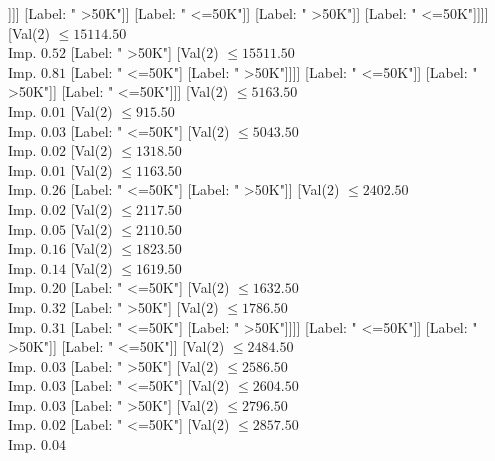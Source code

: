 \documentclass[margin=10pt]{standalone}
\begin{document}
\begin{forest}
																						[Label: " <=50K"]]]]
																			[Label: " >50K"]]
																		[Label: " <=50K"]]
																	[Label: " >50K"]]
																[Label: " <=50K"]]]]
													[Val($2$) $ \leq 15114.50$ \\ Imp. $0.52$
														[Label: " >50K"]
														[Val($2$) $ \leq 15511.50$ \\ Imp. $0.81$
															[Label: " <=50K"]
															[Label: " >50K"]]]]
												[Label: " <=50K"]]
											[Label: " >50K"]]
										[Label: " <=50K"]]]
								[Val($2$) $ \leq 5163.50$ \\ Imp. $0.01$
									[Val($2$) $ \leq 915.50$ \\ Imp. $0.03$
										[Label: " <=50K"]
										[Val($2$) $ \leq 5043.50$ \\ Imp. $0.02$
											[Val($2$) $ \leq 1318.50$ \\ Imp. $0.01$
												[Val($2$) $ \leq 1163.50$ \\ Imp. $0.26$
													[Label: " <=50K"]
													[Label: " >50K"]]
												[Val($2$) $ \leq 2402.50$ \\ Imp. $0.02$
													[Val($2$) $ \leq 2117.50$ \\ Imp. $0.05$
														[Val($2$) $ \leq 2110.50$ \\ Imp. $0.16$
															[Val($2$) $ \leq 1823.50$ \\ Imp. $0.14$
																[Val($2$) $ \leq 1619.50$ \\ Imp. $0.20$
																	[Label: " <=50K"]
																	[Val($2$) $ \leq 1632.50$ \\ Imp. $0.32$
																		[Label: " >50K"]
																		[Val($2$) $ \leq 1786.50$ \\ Imp. $0.31$
																			[Label: " <=50K"]
																			[Label: " >50K"]]]]
																[Label: " <=50K"]]
															[Label: " >50K"]]
														[Label: " <=50K"]]
													[Val($2$) $ \leq 2484.50$ \\ Imp. $0.03$
														[Label: " >50K"]
														[Val($2$) $ \leq 2586.50$ \\ Imp. $0.03$
															[Label: " <=50K"]
															[Val($2$) $ \leq 2604.50$ \\ Imp. $0.03$
																[Label: " >50K"]
																[Val($2$) $ \leq 2796.50$ \\ Imp. $0.02$
																	[Label: " <=50K"]
																	[Val($2$) $ \leq 2857.50$ \\ Imp. $0.04$

\end{forest}
\end{document}
